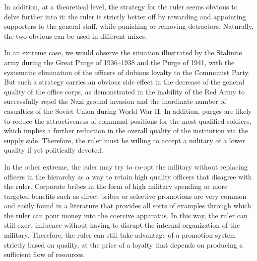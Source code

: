 In addition, at a theoretical level, the strategy for the ruler seems obvious to
delve further into it: the ruler is strictly better off by rewarding and
appointing supporters to the general staff, while punishing or removing
detractors. Naturally, the two obvious can be used in different mixes.

In an extreme case, we would observe the situation illustrated by the Stalinite
army during the Great Purge of 1936--1938 and the Purge of 1941, with the
systematic elimination of the officers of dubious loyalty to the Communist
Party. But such a strategy carries an obvious side effect in the decrease of the
general quality of the office corps, as demonstrated in the inability of the Red
Army to successfully repel the Nazi ground invasion and the inordinate number of
casualties of the Soviet Union during World War II. In addition, purges are
likely to reduce the attractiveness of command positions for the most qualified
soldiers, which implies a further reduction in the overall quality of the
institution via the supply side. Therefore, the ruler must be willing to accept
a military of a lower quality if yet politically devoted.

In the other extreme, the ruler may try to co-opt the military without replacing
officers in the hierarchy as a way to retain high quality officers that disagree
with the ruler. Corporate bribes in the form of high military spending
\citep{powell:2009b} or more targeted benefits such as direct bribes
\citep{goda:2000} or selective promotions are very common and easily found in a
literature that provides all sorts of examples through which the ruler can pour
money into the coercive apparatus. In this way, the ruler can still exert
influence without having to disrupt the internal organization of the military.
Therefore, the ruler can still take advantage of a promotion system strictly
based on quality, at the price of a loyalty that depends on producing a
sufficient flow of resources.

